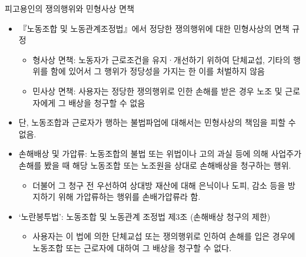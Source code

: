 \documentclass[aspectratio=169,xcolor=dvipsnames,handout]{beamer}
\begin{document}
\begin{frame}[allowframebreaks]{피고용인의 쟁의행위와 민형사상 면책}
    \begin{itemize}[<+->]
        \item 『노동조합 및 노동관계조정법』에서 정당한 쟁의행위에 대한 민형사상의 면책 규정
        \begin{itemize}[<+->]
            \item 형사상 면책: 노동자가 근로조건을 유지·개선하기 위하여 단체교섭, 기타의 행위를 함에 있어서 그 행위가 정당성을 가지는 한 이를 처벌하지 않음
            \item 민사상 면책: 사용자는 정당한 쟁의행위로 인한 손해를 받은 경우 노조 및 근로자에게 그 배상을 청구할 수 없음
        \end{itemize}
        \item 단, 노동조합과 근로자가 행하는 불법파업에 대해서는 민형사상의 책임을 피할 수 없음.
        \item 손해배상 및 가압류: 노동조합의 불법 또는 위법이나 고의 과실 등에 의해 사업주가 손해를 봤을 때 해당 노동조합 또는 노조원을 상대로 손해배상을 청구하는 행위. 
        \begin{itemize}[<+->]
            \item 더불어 그 청구 전 우선하여 상대방 재산에 대해 은닉이나 도피, 감소 등을 방지하기 위해 가압류하는 행위를 손배가압류라 함.
        \end{itemize}
        \item `노란봉투법': 노동조합 및 노동관계 조정법 제3조 (손해배상 청구의 제한)
        \begin{itemize}[<+->]
            \item 사용자는 이 법에 의한 단체교섭 또는 쟁의행위로 인하여 손해를 입은 경우에 노동조합 또는 근로자에 대하여 그 배상을 청구할 수 없다.
        \end{itemize}
    \end{itemize}
\end{frame}
\end{document}
